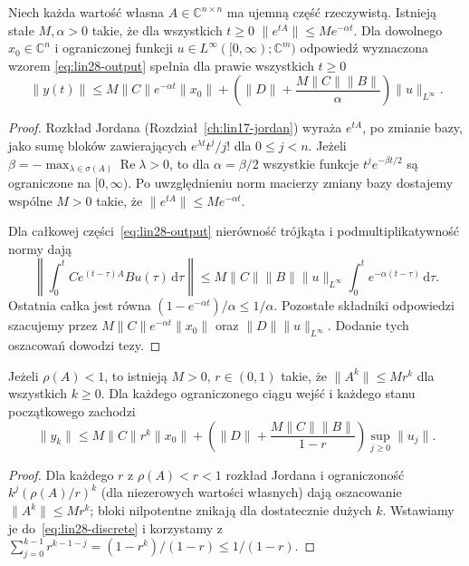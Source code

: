 \begin{twierdzenie}
\label{thm:lin28-bibo}
Niech każda wartość własna
\(A\in\mathbb C^{n\times n}\) ma ujemną
część rzeczywistą.
Istnieją stałe \(M,\alpha>0\)
takie, że dla wszystkich \(t\ge0\)
\(\|e^{tA}\|\le Me^{-\alpha t}\).
Dla dowolnego \(x_0\in\mathbb C^n\)
i ograniczonej funkcji
\(u\in L^\infty([0,\infty);\mathbb C^m)\)
odpowiedź wyznaczona wzorem
\eqref{eq:lin28-output} spełnia
dla prawie wszystkich \(t\ge0\)
\[
 \|y(t)\|\le
 M\|C\|e^{-\alpha t}\|x_0\|
 +\left(\|D\|+\frac{M\|C\|\|B\|}{\alpha}\right)
     \|u\|_{L^\infty}.
 \tag{28.9}\label{eq:lin28-bibo}
\]
\end{twierdzenie}
\begin{proof}
Rozkład Jordana (Rozdział~\ref{ch:lin17-jordan})
wyraża \(e^{tA}\), po zmianie bazy,
jako sumę bloków zawierających
\(e^{\lambda t}t^j/j!\)
dla \(0\le j<n\). Jeżeli
\(\beta=-\max_{\lambda\in\sigma(A)}
\operatorname{Re}\lambda>0\),
to dla \(\alpha=\beta/2\)
wszystkie funkcje
\(t^je^{-\beta t/2}\) są ograniczone
na \([0,\infty)\).
Po uwzględnieniu norm macierzy zmiany
bazy dostajemy wspólne \(M>0\)
takie, że \(\|e^{tA}\|\le Me^{-\alpha t}\).

Dla całkowej części~\eqref{eq:lin28-output}
nierówność trójkąta i podmultiplikatywność
normy dają
\[
 \left\|\int_0^t Ce^{(t-\tau)A}Bu(\tau)
 \,\mathrm d\tau\right\|
 \le M\|C\|\|B\|\|u\|_{L^\infty}
       \int_0^t e^{-\alpha(t-\tau)}\,\mathrm d\tau.
\]
Ostatnia całka jest równa
\((1-e^{-\alpha t})/\alpha\le1/\alpha\).
Pozostałe składniki odpowiedzi szacujemy
przez \(M\|C\|e^{-\alpha t}\|x_0\|\)
oraz \(\|D\|\|u\|_{L^\infty}\).
Dodanie tych oszacowań dowodzi tezy.
\end{proof}

\begin{wniosek}
\label{cor:lin28-discrete-bibo}
Jeżeli \(\rho(A)<1\), to istnieją
\(M>0\), \(r\in(0,1)\) takie, że
\(\|A^k\|\le Mr^k\) dla wszystkich
\(k\ge0\). Dla każdego ograniczonego
ciągu wejść i każdego stanu początkowego
zachodzi
\[
 \|y_k\|\le
 M\|C\|r^k\|x_0\|+
 \left(\|D\|+\frac{M\|C\|\|B\|}{1-r}\right)
 \sup_{j\ge0}\|u_j\|.
 \tag{28.10}\label{eq:lin28-discrete-bibo}
\]
\end{wniosek}
\begin{proof}
Dla każdego \(r\) z \(\rho(A)<r<1\)
rozkład Jordana i ograniczoność
\(k^j(\rho(A)/r)^k\) (dla niezerowych
wartości własnych) dają oszacowanie
\(\|A^k\|\le Mr^k\); bloki nilpotentne
znikają dla dostatecznie dużych \(k\).
Wstawiamy je do~\eqref{eq:lin28-discrete}
i korzystamy z
\(\sum_{j=0}^{k-1}r^{k-1-j}
  =(1-r^k)/(1-r)\le1/(1-r)\).
\end{proof}

